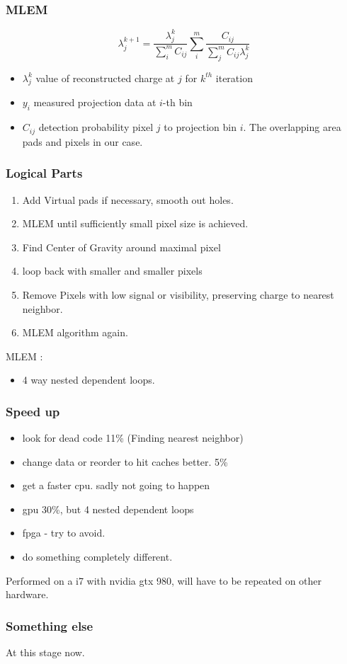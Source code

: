 \documentclass{beamer}
\begin{document}
\begin{frame}
  \frametitle{MLEM }
  \begin{equation}
    \lambda^{k+1}_j = \frac{\lambda_j^k}{\sum_i^m C_{ij}}\sum^m_i\frac{C_{ij}}{\sum^m_jC_{ij}\lambda_j^k}
  \end{equation}
  \begin{itemize}
    \item $\lambda_j^k$ value of reconstructed charge at $j$ for $k^{th}$ iteration
    \item $y_i$ measured projection data at $i$-th bin
    \item $C_{ij}$ detection probability pixel $j$ to projection bin $i$. The overlapping area pads and pixels in our case.
  \end{itemize}
\end{frame}


\begin{frame}
  \frametitle{Logical Parts}
  \begin{enumerate}
    \item Add Virtual pads if necessary, smooth out holes.
    \item MLEM until sufficiently small pixel size is achieved.
    \item Find Center of Gravity around maximal pixel
    \item loop back with smaller and smaller pixels
    \item Remove Pixels with low signal or visibility, preserving charge to nearest neighbor.
    \item MLEM algorithm again.
  \end{enumerate}
  MLEM :
  \begin{itemize}
      \item 4 way nested dependent loops.
  \end{itemize}
\end{frame}


\begin{frame}
  \frametitle{Speed up}
\begin{itemize}
  \item look for dead code 11\% (Finding nearest neighbor)
  \item change data or reorder to hit caches better. 5\%
  \item get a faster cpu. sadly not going to happen 
  \item gpu 30\%, but 4 nested dependent loops
  \item fpga - try to avoid.
  \item do something completely different.
\end{itemize}
Performed on a i7 with nvidia gtx 980, will have to be repeated on other hardware.
\end{frame}

\begin{frame}
\frametitle{Something else}
At this stage now.
\end{frame}
\end{document}
